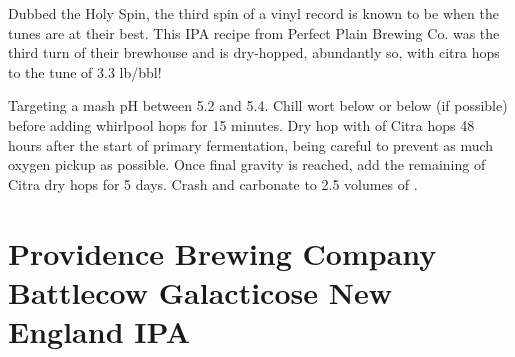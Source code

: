 \documentclass[10pt,oneside]{scrbook}
\begin{document}
\begin{aboutblock}
Dubbed the Holy Spin, the third spin of a vinyl record is known to be when the tunes
are at their best. This IPA recipe from Perfect Plain Brewing Co. was the third turn
of their brewhouse and is dry-hopped, abundantly so, with citra hops to the tune
of 3.3 lb/bbl!
\end{aboutblock}


\begin{methodandtiming}
 
\begin{mashsteps}
\end{mashsteps}

\begin{directions}
Targeting a mash pH between 5.2 and 5.4. Chill wort below  or below (if possible)
before adding whirlpool hops for 15 minutes. Dry hop with  of Citra hops 48 hours
after the start of primary fermentation, being careful to prevent as much oxygen pickup as
possible. Once final gravity is reached, add the remaining  of Citra dry hops for
5 days. Crash and carbonate to 2.5 volumes of .
\end{directions}

\end{methodandtiming}

\pagebreak

\begin{ingredientsblock}

\begin{malts}
\end{malts}

\begin{hops}
\end{hops}

\begin{yeasts}
\end{yeasts}

\end{ingredientsblock}

\chapter*{Providence Brewing Company Battlecow Galacticose New England IPA}
\end{document}
